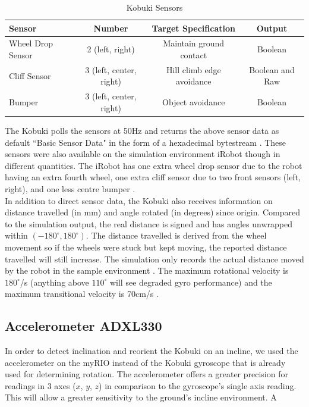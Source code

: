 \documentclass[11pt]{article}
\begin{document}
\begin{table}[H]
\begin{center}
\begin{tabular}{ |l|c|c|c| } 
    \hline
    \textbf{Sensor} & \textbf{Number} & \textbf{Target Specification} & \textbf{Output} \\ 
    \hline
    Wheel Drop Sensor & 2 (left, right) & Maintain ground contact & Boolean\\
    \hline
    Cliff Sensor & 3 (left, center, right) & Hill climb edge avoidance & Boolean and Raw\\
    \hline
    Bumper & 3 (left, center, right) & Object avoidance & Boolean\\
    \hline
\end{tabular}
\caption{Kobuki Sensors} \label{table:kobuki_sensors}
\end{center}
\end{table}
\vspace{-0.5cm}
The Kobuki polls the sensors at 50Hz and returns the above sensor data as default ``Basic Sensor Data" in the form of a hexadecimal bytestream \cite{kobukisensors}. These sensors were also available on the simulation environment iRobot though in different quantities. The iRobot has one extra wheel drop sensor due to the robot having an extra fourth wheel, one extra cliff sensor due to two front sensors (left, right), and one less centre bumper \cite{labguide}.\\

In addition to direct sensor data, the Kobuki also receives information on distance travelled (in mm) and angle rotated (in degrees) since origin. Compared to the simulation output, the real distance is signed and has angles unwrapped within $(-180^\circ, 180^\circ)$. The distance travelled is derived from the wheel movement so if the wheels were stuck but kept moving, the reported distance travelled will still increase. The simulation only records the actual distance moved by the robot in the sample environment \cite{labguide}. The maximum rotational velocity is $180^\circ$/s (anything above $110^\circ$ will see degraded gyro performance) and the maximum transitional velocity is 70cm/s \cite{kobuki_datasheet}. 

\subsection{Accelerometer ADXL330} \label{sec:acc}
\vspace{-0.2cm} In order to detect inclination and reorient the Kobuki on an incline, we used the accelerometer on the myRIO instead of the Kobuki gyroscope that is already used for determining rotation. The accelerometer offers a greater precision for readings in 3 axes ($x$, $y$, $z$) in comparison to the gyroscope's single axis reading. This will allow a greater sensitivity to the ground's incline environment. A\\
\end{document}
